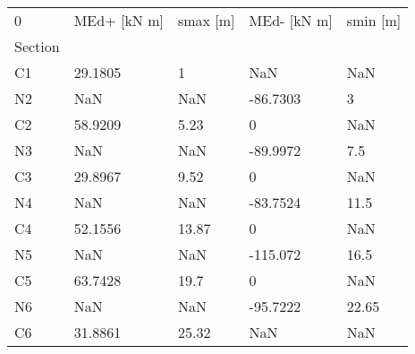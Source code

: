 \begin{tabular}{lllll}
\toprule
0 & MEd+ [kN m] & smax [m] & MEd- [kN m] & smin [m] \\
Section &             &          &             &          \\
\midrule
C1      &     29.1805 &        1 &         NaN &      NaN \\
N2      &         NaN &      NaN &    -86.7303 &        3 \\
C2      &     58.9209 &     5.23 &           0 &      NaN \\
N3      &         NaN &      NaN &    -89.9972 &      7.5 \\
C3      &     29.8967 &     9.52 &           0 &      NaN \\
N4      &         NaN &      NaN &    -83.7524 &     11.5 \\
C4      &     52.1556 &    13.87 &           0 &      NaN \\
N5      &         NaN &      NaN &    -115.072 &     16.5 \\
C5      &     63.7428 &     19.7 &           0 &      NaN \\
N6      &         NaN &      NaN &    -95.7222 &    22.65 \\
C6      &     31.8861 &    25.32 &         NaN &      NaN \\
\bottomrule
\end{tabular}
